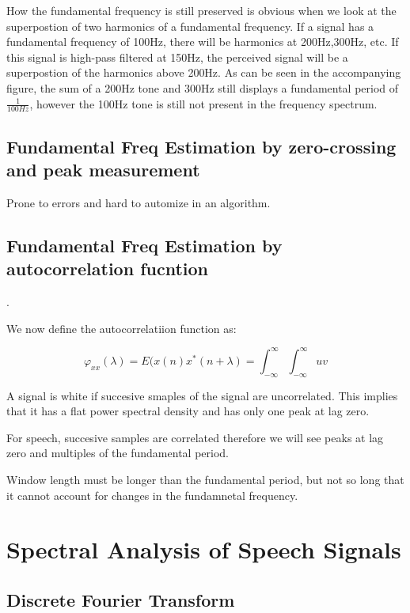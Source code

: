 \documentclass{article}
\begin{document}
	How the fundamental frequency is still preserved is obvious when we look at the superpostion of two harmonics of a fundamental frequency.  If a signal has a fundamental frequency of 100Hz, there will be harmonics at 200Hz,300Hz, etc.  If this signal is high-pass filtered at 150Hz, the perceived signal will be a superpostion of the harmonics above 200Hz.  As can be seen in the accompanying figure, the sum of a 200Hz tone and 300Hz still displays a fundamental period of \begin{math}\frac{1}{100Hz}\end{math}, however the 100Hz tone is still not present in the frequency spectrum.

		


\subsection {Fundamental Freq Estimation by zero-crossing and peak measurement}  Prone to errors and hard to automize in an algorithm.  

\subsection {Fundamental Freq Estimation by autocorrelation fucntion}.  

We now define the autocorrelatiion function as:

\begin{equation}\varphi_{xx}(\lambda) = E(x(n)x^*(n + \lambda) = \int^{\infty}_{-\infty} \int^{\infty}_{-\infty}
uv\end{equation}


A signal is white if succesive smaples of the signal are uncorrelated.  This implies that it has a flat power spectral density and has only one peak at lag zero.

For speech, succesive samples are correlated therefore we will see peaks at lag zero and multiples of the fundamental period.  

Window length must be longer than the fundamental period, but not so long that it cannot account for changes in the fundamnetal frequency. 


\section{Spectral Analysis of Speech Signals}


\subsection{Discrete Fourier Transform}
\end{document}

